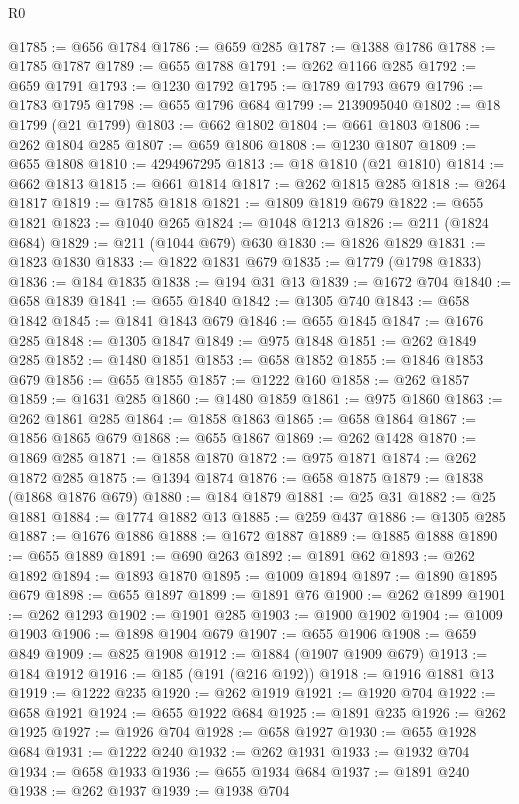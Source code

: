 \begin{lexlean}{R0}
\begin{coremodule}
@1785 := @656 @1784
@1786 := @659 @285
@1787 := @1388 @1786
@1788 := @1785 @1787
@1789 := @655 @1788
@1791 := @262 @1166 @285
@1792 := @659 @1791
@1793 := @1230 @1792
@1795 := @1789 @1793 @679
@1796 := @1783 @1795
@1798 := @655 @1796 @684
@1799 := 2139095040
@1802 := @18 @1799 (@21 @1799)
@1803 := @662 @1802
@1804 := @661 @1803
@1806 := @262 @1804 @285
@1807 := @659 @1806
@1808 := @1230 @1807
@1809 := @655 @1808
@1810 := 4294967295
@1813 := @18 @1810 (@21 @1810)
@1814 := @662 @1813
@1815 := @661 @1814
@1817 := @262 @1815 @285
@1818 := @264 @1817
@1819 := @1785 @1818
@1821 := @1809 @1819 @679
@1822 := @655 @1821
@1823 := @1040 @265
@1824 := @1048 @1213
@1826 := @211 (@1824 @684)
@1829 := @211 (@1044 @679) @630
@1830 := @1826 @1829
@1831 := @1823 @1830
@1833 := @1822 @1831 @679
@1835 := @1779 (@1798 @1833)
@1836 := @184 @1835
@1838 := @194 @31 @13
@1839 := @1672 @704
@1840 := @658 @1839
@1841 := @655 @1840
@1842 := @1305 @740
@1843 := @658 @1842
@1845 := @1841 @1843 @679
@1846 := @655 @1845
@1847 := @1676 @285
@1848 := @1305 @1847
@1849 := @975 @1848
@1851 := @262 @1849 @285
@1852 := @1480 @1851
@1853 := @658 @1852
@1855 := @1846 @1853 @679
@1856 := @655 @1855
@1857 := @1222 @160
@1858 := @262 @1857
@1859 := @1631 @285
@1860 := @1480 @1859
@1861 := @975 @1860
@1863 := @262 @1861 @285
@1864 := @1858 @1863
@1865 := @658 @1864
@1867 := @1856 @1865 @679
@1868 := @655 @1867
@1869 := @262 @1428
@1870 := @1869 @285
@1871 := @1858 @1870
@1872 := @975 @1871
@1874 := @262 @1872 @285
@1875 := @1394 @1874
@1876 := @658 @1875
@1879 := @1838 (@1868 @1876 @679)
@1880 := @184 @1879
@1881 := @25 @31
@1882 := @25 @1881
@1884 := @1774 @1882 @13
@1885 := @259 @437
@1886 := @1305 @285
@1887 := @1676 @1886
@1888 := @1672 @1887
@1889 := @1885 @1888
@1890 := @655 @1889
@1891 := @690 @263
@1892 := @1891 @62
@1893 := @262 @1892
@1894 := @1893 @1870
@1895 := @1009 @1894
@1897 := @1890 @1895 @679
@1898 := @655 @1897
@1899 := @1891 @76
@1900 := @262 @1899
@1901 := @262 @1293
@1902 := @1901 @285
@1903 := @1900 @1902
@1904 := @1009 @1903
@1906 := @1898 @1904 @679
@1907 := @655 @1906
@1908 := @659 @849
@1909 := @825 @1908
@1912 := @1884 (@1907 @1909 @679)
@1913 := @184 @1912
@1916 := @185 (@191 (@216 @192))
@1918 := @1916 @1881 @13
@1919 := @1222 @235
@1920 := @262 @1919
@1921 := @1920 @704
@1922 := @658 @1921
@1924 := @655 @1922 @684
@1925 := @1891 @235
@1926 := @262 @1925
@1927 := @1926 @704
@1928 := @658 @1927
@1930 := @655 @1928 @684
@1931 := @1222 @240
@1932 := @262 @1931
@1933 := @1932 @704
@1934 := @658 @1933
@1936 := @655 @1934 @684
@1937 := @1891 @240
@1938 := @262 @1937
@1939 := @1938 @704

\end{coremodule}
\end{lexlean}

